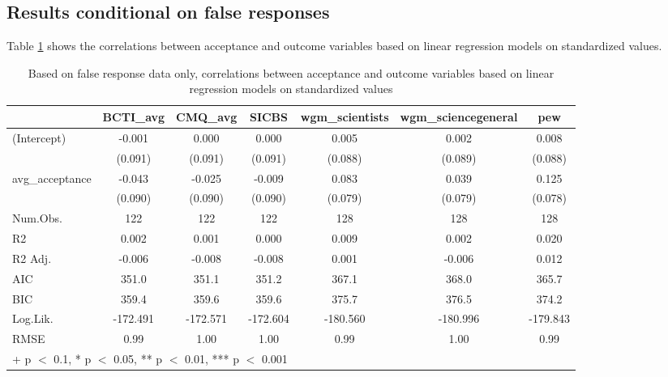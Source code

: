 \documentclass[
  doc,floatsintext]{apa6}
\begin{document}
\subsection{Results conditional on false responses}\label{results-conditional-on-false-responses-2}

Table \ref{tab:exp3-false-response-regression} shows the correlations between acceptance and outcome variables based on linear regression models on standardized values.

\begin{table}
\centering
\caption{\label{tab:exp3-false-response-regression}Based on false response data only, correlations between acceptance and outcome variables based on linear regression models on standardized values}
\centering
\begin{tabular}[t]{lcccccc}
\toprule
  & BCTI\_avg & CMQ\_avg & SICBS & wgm\_scientists & wgm\_sciencegeneral & pew\\
\midrule
(Intercept) & -0.001 & 0.000 & 0.000 & 0.005 & 0.002 & 0.008\\
 & (0.091) & (0.091) & (0.091) & (0.088) & (0.089) & (0.088)\\
avg\_acceptance & -0.043 & -0.025 & -0.009 & 0.083 & 0.039 & 0.125\\
 & (0.090) & (0.090) & (0.090) & (0.079) & (0.079) & (0.078)\\
\midrule
Num.Obs. & 122 & 122 & 122 & 128 & 128 & 128\\
R2 & 0.002 & 0.001 & 0.000 & 0.009 & 0.002 & 0.020\\
R2 Adj. & -0.006 & -0.008 & -0.008 & 0.001 & -0.006 & 0.012\\
AIC & 351.0 & 351.1 & 351.2 & 367.1 & 368.0 & 365.7\\
BIC & 359.4 & 359.6 & 359.6 & 375.7 & 376.5 & 374.2\\
Log.Lik. & -172.491 & -172.571 & -172.604 & -180.560 & -180.996 & -179.843\\
RMSE & 0.99 & 1.00 & 1.00 & 0.99 & 1.00 & 0.99\\
\bottomrule
\multicolumn{7}{l}{\rule{0pt}{1em}+ p $<$ 0.1, * p $<$ 0.05, ** p $<$ 0.01, *** p $<$ 0.001}\\
\end{tabular}
\end{table}
\end{document}
